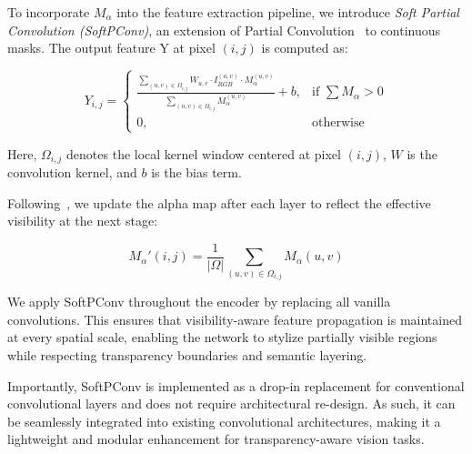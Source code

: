 \documentclass[letterpaper]{article} %
\begin{document}
To incorporate $M_\alpha$ into the feature extraction pipeline, we introduce \emph{Soft Partial Convolution (SoftPConv)}, an extension of Partial Convolution~\cite{liu2018image} to continuous masks. The output feature Y at pixel $(i, j)$ is computed as:

\begin{equation}
Y_{i,j} = 
\begin{cases}
\displaystyle
\frac{
\sum\limits_{(u,v) \in \Omega_{i,j}} W_{u,v} \cdot I_{RGB}^{(u, v)} \cdot M_\alpha^{(u, v)}
}{
\sum\limits_{(u,v) \in \Omega_{i,j}} M_\alpha^{(u, v)}
} + b, & \text{if } \sum M_\alpha > 0 \\
0, & \text{otherwise}
\end{cases}
\label{eq:softpconv}
\end{equation}

Here, $\Omega_{i,j}$ denotes the local kernel window centered at pixel $(i,j)$, $W$ is the convolution kernel, and $b$ is the bias term.

Following~\cite{liu2018image}, we update the alpha map after each layer to reflect the effective visibility at the next stage:

\begin{equation}
M_\alpha'(i,j) = \frac{1}{|\Omega|} \sum\limits_{(u,v) \in \Omega_{i,j}} M_\alpha(u,v)
\label{eq:mask_update}
\end{equation}

We apply SoftPConv throughout the encoder by replacing all vanilla convolutions. This ensures that visibility-aware feature propagation is maintained at every spatial scale, enabling the network to stylize partially visible regions while respecting transparency boundaries and semantic layering. 

Importantly, SoftPConv is implemented as a drop-in replacement for conventional convolutional layers and does not require architectural re-design. As such, it can be seamlessly integrated into existing convolutional architectures, making it a lightweight and modular enhancement for transparency-aware vision tasks.
\end{document}
